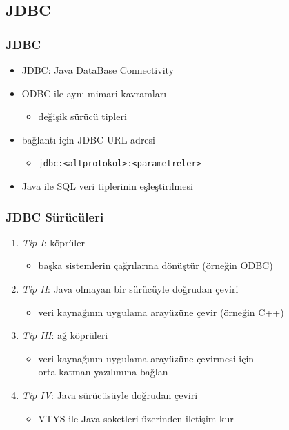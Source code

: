 \documentclass[dvipsnames]{beamer}
\theoremstyle{definition}
\theoremstyle{example}
\theoremstyle{plain}
\begin{document}
\lstset{language=Java}

\subsection{JDBC}

\begin{frame}
  \frametitle{JDBC}

  \begin{itemize}
    \item \alert{JDBC}: Java DataBase Connectivity

    \pause
    \item ODBC ile aynı mimari kavramları
    \begin{itemize}
      \item değişik sürücü tipleri
    \end{itemize}

    \pause
    \item bağlantı için JDBC URL adresi
    \begin{itemize}
      \item \lstinline!jdbc:<altprotokol>:<parametreler>!
    \end{itemize}

    \pause
    \item Java ile SQL veri tiplerinin eşleştirilmesi
  \end{itemize}
\end{frame}

\begin{frame}
  \frametitle{JDBC Sürücüleri}

  \begin{enumerate}
    \item \emph{Tip I}: köprüler
    \begin{itemize}
      \item başka sistemlerin çağrılarına dönüştür (örneğin ODBC)
    \end{itemize}

    \pause
    \item \emph{Tip II}: Java olmayan bir sürücüyle doğrudan çeviri
    \begin{itemize}
      \item veri kaynağının uygulama arayüzüne çevir (örneğin C++)
    \end{itemize}

    \pause
    \item \emph{Tip III}: ağ köprüleri
    \begin{itemize}
      \item veri kaynağının uygulama arayüzüne çevirmesi için\\
	orta katman yazılımına bağlan
    \end{itemize}

    \pause
    \item \emph{Tip IV}: Java sürücüsüyle doğrudan çeviri
    \begin{itemize}
      \item VTYS ile Java soketleri üzerinden iletişim kur
    \end{itemize}
  \end{enumerate}
\end{frame}
\end{document}
